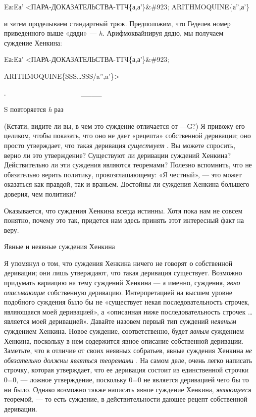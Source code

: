 Eа:Eа' \textless ПАРА-ДОКАЗАТЕЛЬСТВА-ТТЧ\{а,а'\}\&\#923; ARITHMOQUINE\{а'',а'\}

и затем проделываем стандартный трюк. Предположим, что Геделев номер приведенного выше «дяди» --- \emph{h.} Арифмоквайнируя дядю, мы получаем суждение Хенкина:

Eа:Eа' \textless ПАРА-ДОКАЗАТЕЛЬСТВА-ТТЧ\{а,а'\}\&\#923;

ARITHMOQUINE\{SSS\ldots SSS/a'',a'\}\textgreater{}

.~~~~~~~~~~~~~~~~~~~~~ \textbar\_\_\_\_\textbar{}

S повторяется \emph{h} раз

(Кстати, видите ли вы, в чем это суждение отличается от ---G?) Я привожу его целиком, чтобы показать, что оно не дает «рецепта» собственной деривации; оно просто утверждает, что такая деривация \emph{существует} . Вы можете спросить, верно ли это утверждение? Существуют ли деривации суждений Хенкина? Действительно ли эти суждения являются теоремами? Полезно вспомнить, что не обязательно верить политику, провозглашающему: «Я честный», --- это может оказаться как правдой, так и враньем. Достойны ли суждения Хенкина большего доверия, чем политики?

Оказывается, что суждения Хенкина всегда истинны. Хотя пока нам не совсем понятно, почему это так, придется нам здесь принять этот интересный факт на веру.

Явные и неявные суждения Хенкина

Я упомянул о том, что суждения Хенкина ничего не говорят о собственной деривации; они лишь утверждают, что такая деривация существует. Возможно придумать вариацию на тему суждений Хенкина --- а именно, суждения, \emph{явно описывающие} собственную деривацию. Интерпретацией на высшем уровне подобного суждения было бы не «существует некая последовательность строчек, являющаяся моей деривацией», а «описанная ниже последовательность строчек \ldots{} является моей деривацией». Давайте назовем первый тип суждений \emph{неявным} суждением Хенкина. Новое суждение, соответственно, будет \emph{явным} суждением Хенкина, поскольку в нем содержится явное описание собственной деривации. Заметьте, что в отличие от своих неявных собратьев, явные суждения Хенкина \emph{не обязательно должны являться теоремами} . На самом деле, очень легко написать строчку, которая утверждает, что ее деривация состоит из единственной строчки 0=0, --- ложное утверждение, поскольку 0=0 не является деривацией чего бы то ни было. Однако возможно также написать явное суждение Хенкина, \emph{являющееся} теоремой, --- то есть суждение, в действительности дающее рецепт собственной деривации.

